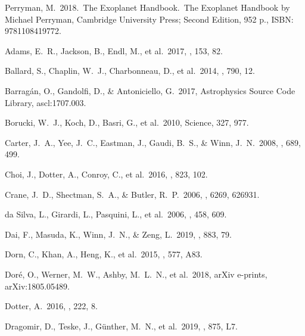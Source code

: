  Perryman, M.\ 2018.\ The Exoplanet Handbook.\ The Exoplanet Handbook by Michael Perryman, Cambridge University Press; Second Edition, 952 p., ISBN: 9781108419772.










 Adams, E.~R., Jackson, B., Endl, M., et al.\ 2017, \aj, 153, 82.

 Ballard, S., Chaplin, W.~J., Charbonneau, D., et al.\ 2014, \apj, 790, 12.

 Barrag{\'a}n, O., Gandolfi, D., \& Antoniciello, G.\ 2017, Astrophysics Source Code Library, ascl:1707.003.

 Borucki, W.~J., Koch, D., Basri, G., et al.\ 2010, Science, 327, 977.

 Carter, J.~A., Yee, J.~C., Eastman, J., Gaudi, B.~S., \& Winn, J.~N.\ 2008, \apj, 689, 499.

 Choi, J., Dotter, A., Conroy, C., et al.\ 2016, \apj, 823, 102.

 Crane, J.~D., Shectman, S.~A., \& Butler, R.~P.\ 2006, \procspie, 6269, 626931.



 da Silva, L., Girardi, L., Pasquini, L., et al.\ 2006, \aap, 458, 609.

 Dai, F., Masuda, K., Winn, J.~N., \& Zeng, L.\ 2019, \apj, 883, 79.

 Dorn, C., Khan, A., Heng, K., et al.\ 2015, \aap, 577, A83.

 Dor{\'e}, O., Werner, M.~W., Ashby, M.~L.~N., et al.\ 2018, arXiv e-prints, arXiv:1805.05489.

 Dotter, A.\ 2016, \apjs, 222, 8.

 Dragomir, D., Teske, J., G{\"u}nther, M.~N., et al.\ 2019, \apjl, 875, L7.

